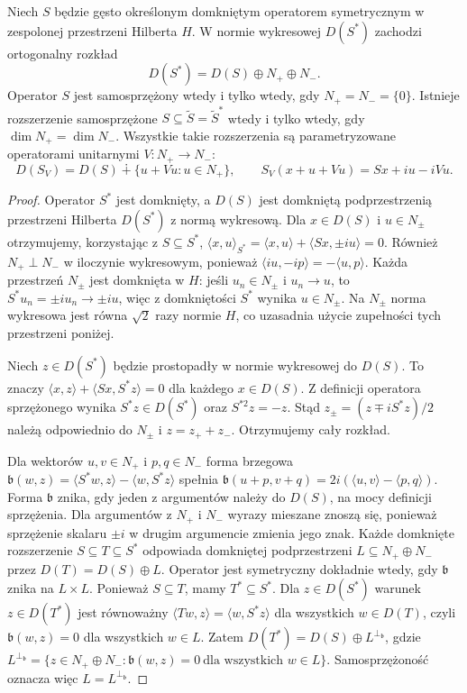 \begin{twierdzenie}
\label{thm:von-neumann33}
Niech $S$ będzie gęsto określonym domkniętym operatorem
symetrycznym w zespolonej przestrzeni Hilberta $H$.
W normie wykresowej $D(S^*)$ zachodzi ortogonalny rozkład
\[
 D(S^*)=D(S)\oplus N_+\oplus N_-.
\]
Operator $S$ jest samosprzężony wtedy i tylko wtedy,
gdy $N_+=N_-=\{0\}$. Istnieje rozszerzenie samosprzężone
$S\subseteq\widetilde S=\widetilde S^*$ wtedy i tylko wtedy,
gdy $\dim N_+=\dim N_-$. Wszystkie takie rozszerzenia są
parametryzowane operatorami unitarnymi $V:N_+\to N_-$:
\[
 D(S_V)=D(S)\dotplus\{u+Vu:u\in N_+\},\qquad
 S_V(x+u+Vu)=Sx+iu-iVu.
\]
\end{twierdzenie}
\begin{proof}
Operator $S^*$ jest domknięty, a $D(S)$ jest domkniętą
podprzestrzenią przestrzeni Hilberta $D(S^*)$ z normą wykresową.
Dla $x\in D(S)$ i $u\in N_\pm$ otrzymujemy, korzystając
z $S\subseteq S^*$,
$\langle x,u\rangle_{S^*}=\langle x,u\rangle+
\langle Sx,\pm i u\rangle=0$.
Również $N_+\perp N_-$ w iloczynie wykresowym, ponieważ
$\langle iu,-ip\rangle=-\langle u,p\rangle$.
Każda przestrzeń $N_\pm$ jest domknięta w $H$: jeśli
$u_n\in N_\pm$ i $u_n\to u$, to $S^*u_n=\pm iu_n\to\pm iu$,
więc z domkniętości $S^*$ wynika $u\in N_\pm$.
Na $N_\pm$ norma wykresowa jest równa $\sqrt2$ razy normie $H$,
co uzasadnia użycie zupełności tych przestrzeni poniżej.

Niech $z\in D(S^*)$ będzie prostopadły w normie wykresowej
do $D(S)$. To znaczy
$\langle x,z\rangle+\langle Sx,S^*z\rangle=0$
dla każdego $x\in D(S)$. Z definicji operatora sprzężonego
wynika $S^*z\in D(S^*)$ oraz $S^{*2}z=-z$.
Stąd $z_\pm=(z\mp iS^*z)/2$ należą odpowiednio do $N_\pm$
i $z=z_++z_-$. Otrzymujemy cały rozkład.

Dla wektorów $u,v\in N_+$ i $p,q\in N_-$
forma brzegowa
$\mathfrak b(w,z)=\langle S^*w,z\rangle-
\langle w,S^*z\rangle$ spełnia
$\mathfrak b(u+p,v+q)=2i(\langle u,v\rangle-\langle p,q\rangle)$.
Forma $\mathfrak b$ znika, gdy jeden z argumentów należy do
$D(S)$, na mocy definicji sprzężenia. Dla argumentów z $N_+$ i
$N_-$ wyrazy mieszane znoszą się, ponieważ sprzężenie skalaru
$\pm i$ w drugim argumencie zmienia jego znak.
Każde domknięte rozszerzenie $S\subseteq T\subseteq S^*$
odpowiada domkniętej podprzestrzeni
$L\subseteq N_+\oplus N_-$ przez
$D(T)=D(S)\oplus L$. Operator jest symetryczny dokładnie
wtedy, gdy $\mathfrak b$ znika na $L\times L$.
Ponieważ $S\subseteq T$, mamy $T^*\subseteq S^*$.
Dla $z\in D(S^*)$ warunek $z\in D(T^*)$ jest równoważny
$\langle Tw,z\rangle=\langle w,S^*z\rangle$ dla wszystkich
$w\in D(T)$, czyli $\mathfrak b(w,z)=0$ dla wszystkich $w\in L$.
Zatem $D(T^*)=D(S)\oplus L^{\perp_{\mathfrak b}}$, gdzie
$L^{\perp_{\mathfrak b}}=\{z\in N_+\oplus N_-:\mathfrak b(w,z)=0
\ \text{dla wszystkich }w\in L\}$.
Samosprzężoność oznacza więc $L=L^{\perp_{\mathfrak b}}$.


\end{proof}

